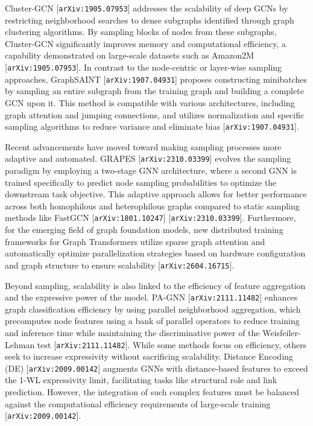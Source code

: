 \documentclass[11pt]{article}
\begin{document}
Cluster-GCN [\texttt{arXiv:1905.07953}] addresses the scalability of deep GCNs by restricting neighborhood searches to dense subgraphs identified through graph clustering algorithms. By sampling blocks of nodes from these subgraphs, Cluster-GCN significantly improves memory and computational efficiency, a capability demonstrated on large-scale datasets such as Amazon2M [\texttt{arXiv:1905.07953}]. In contrast to the node-centric or layer-wise sampling approaches, GraphSAINT [\texttt{arXiv:1907.04931}] proposes constructing minibatches by sampling an entire subgraph from the training graph and building a complete GCN upon it. This method is compatible with various architectures, including graph attention and jumping connections, and utilizes normalization and specific sampling algorithms to reduce variance and eliminate bias [\texttt{arXiv:1907.04931}].

Recent advancements have moved toward making sampling processes more adaptive and automated. GRAPES [\texttt{arXiv:2310.03399}] evolves the sampling paradigm by employing a two-stage GNN architecture, where a second GNN is trained specifically to predict node sampling probabilities to optimize the downstream task objective. This adaptive approach allows for better performance across both homophilous and heterophilous graphs compared to static sampling methods like FastGCN [\texttt{arXiv:1801.10247}] [\texttt{arXiv:2310.03399}]. Furthermore, for the emerging field of graph foundation models, new distributed training frameworks for Graph Transformers utilize sparse graph attention and automatically optimize parallelization strategies based on hardware configuration and graph structure to ensure scalability [\texttt{arXiv:2604.16715}].

Beyond sampling, scalability is also linked to the efficiency of feature aggregation and the expressive power of the model. PA-GNN [\texttt{arXiv:2111.11482}] enhances graph classification efficiency by using parallel neighborhood aggregation, which precomputes node features using a bank of parallel operators to reduce training and inference time while maintaining the discriminative power of the Weisfeiler-Lehman test [\texttt{arXiv:2111.11482}]. While some methods focus on efficiency, others seek to increase expressivity without sacrificing scalability. Distance Encoding (DE) [\texttt{arXiv:2009.00142}] augments GNNs with distance-based features to exceed the 1-WL expressivity limit, facilitating tasks like structural role and link prediction. However, the integration of such complex features must be balanced against the computational efficiency requirements of large-scale training [\texttt{arXiv:2009.00142}].
\end{document}
